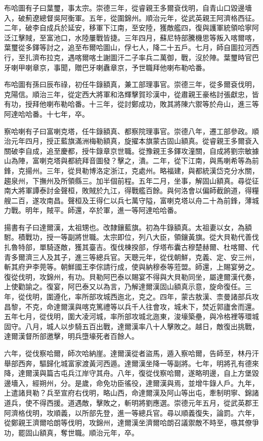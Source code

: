 \begin{pinyinscope}
布哈圖有子曰葉璽，事太宗。崇德三年，從睿親王多爾袞伐明，自青山口毀邊墻入，破薊遼總督吳阿衡軍。五年，從圍錦州。順治元年，從武英親王阿濟格西征。二年，破李自成兵於延安，移軍下江南，至安陸，獲敵艦四，復與護軍統領哈寧阿泛江擊賊，至富池口，水陸屢戰皆捷。三年四月，蘇尼特部騰機思等叛入喀爾喀，葉璽從多鐸等討之，追至布爾哈圖山，俘七人，降二十五戶。七月，師自圖拉河西行，至扎濟布拉克，遇喀爾喀土謝圖汗二子率兵二萬御，戰，沒於陣。葉璽時官巴牙喇甲喇章京，事聞，贈巴牙喇纛章京，予世職拜他喇布勒哈番。

布哈圖有孫曰辰布祿，初任牛錄額真，兼工部理事官。崇德三年，從多爾袞伐明，克陽信。順治三年，從定西大將軍和洛輝擊賀珍漢中，從肅親王豪格討張獻忠，皆有功，授拜他喇布勒哈番。十三年，從討鄭成功，敗其將陳六禦等於舟山，進三等阿達哈哈番。十七年，卒。

察哈喇有子曰富喇克塔，任牛錄額真、都察院理事官。崇德八年，遷工部參政。順治元年四月，授正藍旗滿洲梅勒額真，旋擢本旗蒙古固山額真。從睿親王多爾袞入關破李自成，追至慶都，授牛錄章京世職。從豫親王多鐸攻潼關，自成將劉宗敏據山為陣，富喇克塔與都統拜音圖發？擊之，潰。二年，從下江南，與馬喇希等為前鋒，克揚州。三年，從貝勒博洛定浙江，克處州。略福建，與都統漢岱克分水關，趨泉州，下撫州及所領縣三。加半個前程。五年二月，坐事，解固山額真。尋從征南大將軍譚泰討金聲桓，敗賊於九江，得戰艦百餘。與何洛會以偏師截餉道，得糧艘二百，遂攻南昌。聲桓及王得仁以兵七萬守隘，富喇克塔以舟二十為前鋒，薄城力戰。明年，賊平。師還，卒於軍，進一等阿達哈哈番。

揚書有子曰達爾漢，太祖甥也。改隸鑲藍旗。初為牛錄額真。太祖妻以女，為額駙。積戰功，授一等副將世職。太宗即位，列八大臣，領鑲黃旗。從大貝勒代善伐扎魯特部，單騎逐敵，獲其臺吉。復伐棟揆部，俘塔布囊古穆楚赫爾、杜喀爾、代青多爾濟三人及其子，進三等總兵官。天聰元年，從伐朝鮮，克義、定、安三州，斬其府尹李莞等。朝鮮國王李倧請行成，使與納穆泰等蒞盟。師還，上賜宴勞之。復從伐明，攻錦州，有功。貝勒阿巴泰以賜宴不得與大貝勒同坐，屬達爾漢代奏，上使勸諭之。復宴，阿巴泰又以為言，乃解達爾漢固山額真示意，旋命復任。三年，從伐明，圍遵化，率所部攻城西迤北，克之。四年，蒙古敖漢、柰曼諸部兵攻昌黎，不克，命達爾漢與喀克篤禮等以兵千人往會攻，城未下，焚近郭廬舍而還。五年七月，從伐明，圍大凌河城，率所部攻城北迤東，浚壕築壘，與冷格裡等環城固守。八月，城人以步騎五百出戰，達爾漢率八十人擊敗之。越日，敵復出挑戰，達爾漢督所部邀擊，明兵墮壕死者百餘人。

六年，從伐察哈爾，師次哈納崖。達爾漢從者盜馬，遁入察哈爾，告師至，林丹汗舉部西奔，驅歸化城富家渡黃河西遁。達爾漢坐降一等副將。七年，明將孔有德來降，達爾漢與篇古屯兵江岸守其舟。八年，復從伐察哈爾，遂略明邊，自上方堡毀邊墻入，經朔州，分。是歲，命免功臣徭役，達爾漢與焉，並增牛錄人戶。九年，上遣諸貝勒？兵至宣府右伐明，略山西，命達爾漢及阿山等出屯，牽制明寧、錦諸道兵，使不得西援。道遇敵，擊敗之，斬明將劉應選。崇德元年五月，從武英郡王阿濟格伐明，攻順義，以所部先登，進一等總兵官。尋以順義復失，論罰。六年，從鄭親王濟爾哈朗等伐明，攻錦州，達爾漢坐濟爾哈朗召議禦敵不時至，嗾其僚爭功，罷固山額真，奪世職。順治元年，卒。


\end{pinyinscope}
